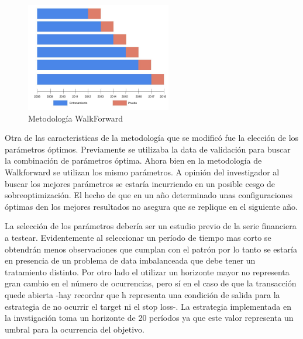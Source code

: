 \documentclass[a4paper,12pt]{Latex/Classes/PhDthesisPSnPDF}
\begin{document}
\begin{figure}[ht]
\begin{center}
\includegraphics[width=2.5in]{images/walkforward_plot}
\end{center}
\caption{Metodología WalkForward}
\end{figure}

Otra de las caracteristicas de la metodología que se modificó fue la elección de los parámetros óptimos. Previamente se utilizaba la data de validación para buscar la combinación de parámetros óptima. Ahora bien en la metodología de Walkforward se utilizan los mismo parámetros. A opinión del investigador al buscar los mejores parámetros se estaría incurriendo en un posible cesgo de sobreoptimización. El hecho de que en un año determinado unas configuraciones óptimas den los mejores resultados no asegura que se replique en el siguiente año.

La selección de los parámetros debería ser un estudio previo de la serie financiera a testear. Evidentemente al seleccionar un período de tiempo mas corto se obtendrán menos observaciones que cumplan con el patrón por lo tanto se estaría en presencia de un problema de data imbalanceada que debe tener un tratamiento distinto. Por otro lado el utilizar un horizonte mayor no representa gran cambio en el número de ocurrencias, pero sí en el caso de que la transacción quede abierta -hay recordar que h representa una condición de salida para la estrategia de no ocurrir el target ni el stop loss-. La estrategia implementada en la invstigación toma un horizonte de 20 períodos ya que este valor representa un umbral para la ocurrencia del objetivo.
\end{document}
